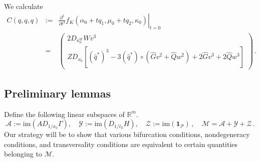 \documentclass[11pt]{amsart}
\renewcommand{\k}{\kappa}
\newcommand{\R}{\mathbb{R}}
\newcommand{\wQ}{\widehat{Q}}
\newcommand{\wG}{\widehat{G}}
\newcommand{\mA}{\mathcal{A}}
\newcommand{\mP}{\mathcal{P}}
\newcommand{\mM}{\mathcal{M}}
\newcommand{\mY}{\mathcal{Y}}
\newcommand{\mZ}{\mathcal{Z}}
\theoremstyle{definition}
\begin{document}
We calculate
\begin{eqnarray}
\label{eqwc}
C(q,q,q) &:=& \left.\frac{\partial^3}{\partial t^3} f_K(\alpha_0 + tq_1, \mu_0 + tq_2, \k_0)\right|_{t=0}\\\nonumber &=& 
\left(\begin{array}{c} 2 D_{\k_0^W}W v^3\\Z D_{x_0}[(\hat{q}^*)^3 - 3(\hat{q}^*)\circ (\wG v^2 + \wQ w^2) + 2\wG v^3 +2\wQ w^3]\end{array}\right)\,.
\end{eqnarray}


\subsection{Preliminary lemmas} 

Define the following linear subspaces of $\R^m$. 
\[
\mA:= \mathrm{im}(A D_{1/x_0}\Gamma), \quad \mY:= \mathrm{im}(D_{1/\hat{c}_0}H), \quad \mZ:= \mathrm{im}(\bm{1}_\mP)\,, \quad \mM = \mA + \mY + \mZ\,.
\]
Our strategy will be to show that various bifurcation conditions, nondegeneracy conditions, and transversality conditions are equivalent to certain quantities belonging to $\mM$. 
\end{document}
